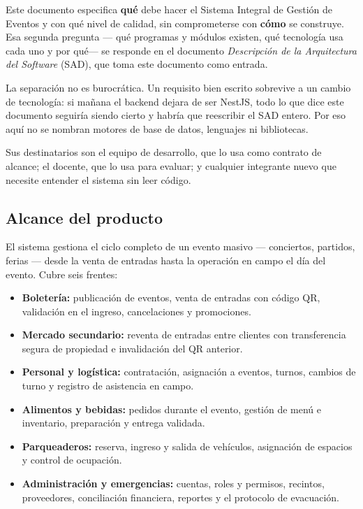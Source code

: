 \documentclass[11pt,a4paper]{article}
\begin{document}
Este documento especifica \textbf{qué} debe hacer el Sistema Integral de Gestión de Eventos y con
qué nivel de calidad, sin comprometerse con \textbf{cómo} se construye. Esa segunda pregunta ---
qué programas y módulos existen, qué tecnología usa cada uno y por qué--- se responde en el documento
\textit{Descripción de la Arquitectura del Software} (SAD), que toma este documento como entrada.

La separación no es burocrática. Un requisito bien escrito sobrevive a un cambio de tecnología: si
mañana el backend dejara de ser NestJS, todo lo que dice este documento seguiría siendo cierto y
habría que reescribir el SAD entero. Por eso aquí no se nombran motores de base de datos, lenguajes
ni bibliotecas.

Sus destinatarios son el equipo de desarrollo, que lo usa como contrato de alcance; el docente, que
lo usa para evaluar; y cualquier integrante nuevo que necesite entender el sistema sin leer código.

\subsection{Alcance del producto}

El sistema gestiona el ciclo completo de un evento masivo --- conciertos, partidos, ferias --- desde
la venta de entradas hasta la operación en campo el día del evento. Cubre seis frentes:

\begin{itemize}
  \item \textbf{Boletería:} publicación de eventos, venta de entradas con código QR, validación en
        el ingreso, cancelaciones y promociones.
  \item \textbf{Mercado secundario:} reventa de entradas entre clientes con transferencia segura de
        propiedad e invalidación del QR anterior.
  \item \textbf{Personal y logística:} contratación, asignación a eventos, turnos, cambios de turno
        y registro de asistencia en campo.
  \item \textbf{Alimentos y bebidas:} pedidos durante el evento, gestión de menú e inventario,
        preparación y entrega validada.
  \item \textbf{Parqueaderos:} reserva, ingreso y salida de vehículos, asignación de espacios y
        control de ocupación.
  \item \textbf{Administración y emergencias:} cuentas, roles y permisos, recintos, proveedores,
        conciliación financiera, reportes y el protocolo de evacuación.
\end{itemize}
\end{document}
